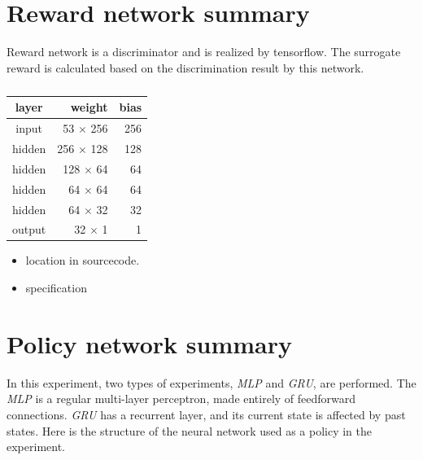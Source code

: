 \section{Reward network summary}

Reward network is a discriminator and is realized by tensorflow. The surrogate reward is calculated based on the discrimination result by this network.

\begin{table}[H]
\centering
\begin{tabular}{|c|r|r|}
\hline 
layer  & weight   & bias \\ \hline \hline
input  & 53 $\times$ 256 & 256  \\
hidden & 256 $\times$ 128 & 128 \\ 
hidden & 128 $\times$ 64 & 64 \\ 
hidden & 64 $\times$ 64 & 64 \\ 
hidden & 64 $\times$ 32 & 32 \\ 
output & 32 $\times$ 1 & 1 \\ 
\hline
\end{tabular} 
\caption{}
\label{tab:reward_network}
\end{table}


\begin{itemize}
\item location in sourcecode.
\item specification
\end{itemize}


\section{Policy network summary}

In this experiment, two types of experiments, {\it MLP} and {\it GRU}, are performed. The {\it MLP} is a regular multi-layer perceptron, made entirely of feedforward connections. {\it GRU} has a recurrent layer, and its current state is affected by past states. Here is the structure of the neural network used as a policy in the experiment.





